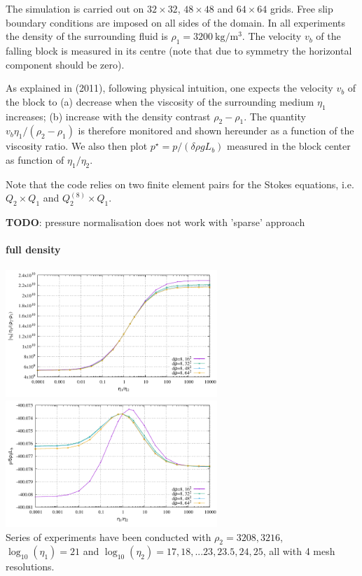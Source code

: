 The simulation is carried out on $32\times32$, $48\times48$ and $64\times 64$ grids. Free slip
boundary conditions are imposed on all sides of the domain. 
In all experiments the density of the surrounding fluid is $\rho_1=3200~\si{\kg\per\cubic\meter}$.
The velocity $v_b$ of the falling block is measured in its centre (note that due to symmetry 
the horizontal component should be zero).

As explained in \textcite{thie11} (2011), following physical intuition, one expects 
the velocity $v_b$ of the block to (a) decrease when the viscosity
of the surrounding medium $\eta_1$ increases; (b) increase with the
density contrast $\rho_2-\rho_1$. 
The quantity $v_b \eta_1/(\rho_2-\rho_1)$ is therefore monitored and shown hereunder as a function of 
the viscosity ratio.
We also then plot $p^\star=p/(\delta \rho g L_b)$ measured in the block center 
as function of $\eta_1/\eta_2$. 

Note that the code relies on two finite element pairs for the Stokes equations, 
i.e. $Q_2\times Q_1$ and $Q_2^{(8)}\times Q_1$.

{\bf TODO}: pressure normalisation does not work with 'sparse' approach

\paragraph{full density}

\begin{center}
\includegraphics[width=8cm]{python_codes/fieldstone_53/results/full/results_v.pdf}
\includegraphics[width=8cm]{python_codes/fieldstone_53/results/full/results_p.pdf}\\
{\captionfont
Series of experiments have been conducted with $\rho_2=3208,3216$, 
$\log_{10}(\eta_1)=21$ and $\log_{10}(\eta_2)=17,18,...23,23.5,24,25$, 
all with 4 mesh resolutions.}
 \end{center}

